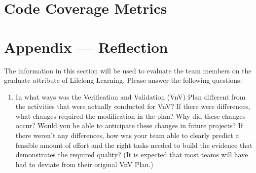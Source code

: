 \documentclass[12pt, titlepage]{article}
\begin{document}
\newpage

\section{Code Coverage Metrics}




\newpage{}
\section*{Appendix --- Reflection}

The information in this section will be used to evaluate the team members on the
graduate attribute of Lifelong Learning.  Please answer the following questions:
\begin{enumerate}
  \item
In what ways was the Verification and Validation (VnV) Plan different
from the activities that were actually conducted for VnV? If there were
differences, what changes required the modification in the plan? Why
did these changes occur? Would you be able to anticipate these changes
in future projects? If there weren’t any differences, how was your team
able to clearly predict a feasible amount of effort and the right tasks
needed to build the evidence that demonstrates the required quality?
(It is expected that most teams will have had to deviate from their
original VnV Plan.)

\end{enumerate}
\end{document}
